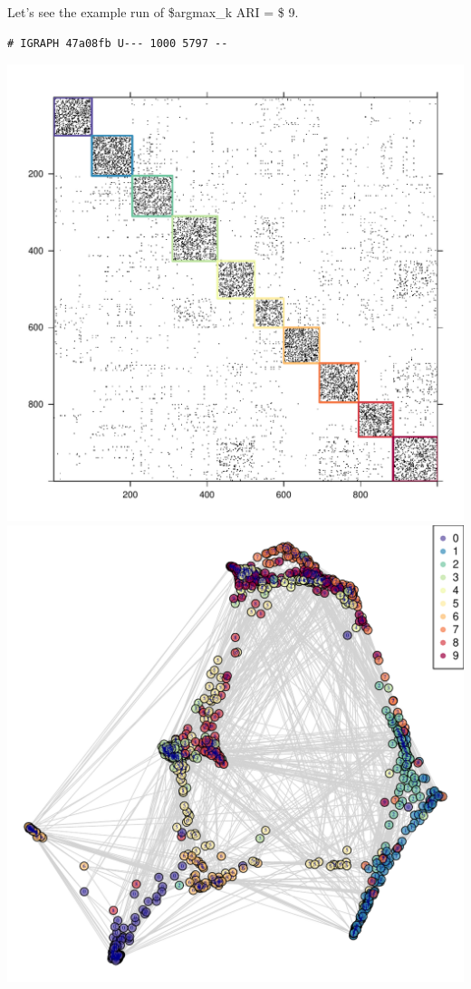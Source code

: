 \documentclass[]{article}
\begin{document}
Let's see the example run of \$argmax\_k ARI = \$ 9.

\begin{verbatim}
# IGRAPH 47a08fb U--- 1000 5797 --
\end{verbatim}

\includegraphics{gmmase_files/figure-latex/knnplot-1.pdf}
\includegraphics{gmmase_files/figure-latex/knnplot-2.pdf}
\end{document}
